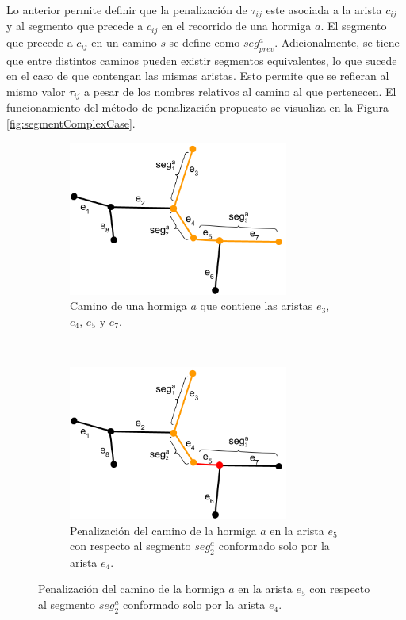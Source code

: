 Lo anterior permite definir que la penalizaci\'on de $\tau_{ij}$ este asociada a la arista $c_{ij}$ y al segmento que precede a $c_{ij}$ en el recorrido de una hormiga $a$. El segmento que precede a $c_{ij}$ en un camino $s$ se define como $seg^{a}_{prev}$. Adicionalmente, se tiene que entre distintos caminos pueden existir segmentos equivalentes, lo que sucede en el caso de que contengan las mismas aristas. Esto permite que se refieran al mismo valor $\tau_{ij}$ a pesar de los nombres relativos al camino al que pertenecen. El funcionamiento del m\'etodo de penalizaci\'on propuesto se visualiza en la Figura \ref{fig:segmentComplexCase}.
 \begin{figure}[t!]
    \centering
    \begin{subfigure}[t]{0.48\textwidth}
        \centering
        \includegraphics[height=2in]{imagenes/ant_segments_complex_case_1.png}
        \caption{Camino de una hormiga $a$ que contiene las aristas $e_3$, $e_4$, $e_5$ y $e_7$.}
        \label{fig:segmentComplexCase1}
    \end{subfigure}%
    ~ \hspace{0.5cm}
    \begin{subfigure}[t]{0.48\textwidth}
        \centering
        \includegraphics[height=2in]{imagenes/ant_segments_complex_case_2.png}
        \caption{Penalizaci\'on del camino de la hormiga $a$ en la arista $e_5$ con respecto al segmento $seg^{a}_2$ conformado solo por la arista $e_4$.}
        \label{fig:segmentComplexCase2}
    \end{subfigure}


\end{figure}
